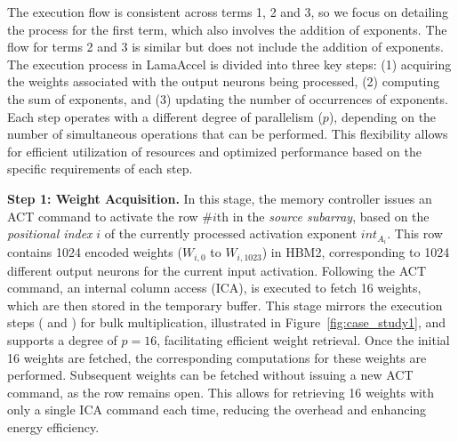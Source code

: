 The execution flow is consistent across terms 1, 2 and 3, so we focus on detailing the process for the first term, which also involves the addition of exponents. The flow for terms 2 and 3 is similar but does not include the addition of exponents. The execution process in LamaAccel is divided into three key steps: (1) acquiring the weights associated with the output neurons being processed, (2) computing the sum of exponents, and (3) updating the number of occurrences of exponents. Each step operates with a different degree of parallelism ($p$), depending on the number of simultaneous operations that can be performed. This flexibility allows for efficient utilization of resources and optimized performance based on the specific requirements of each step.

\textbf{Step 1: Weight Acquisition.} In this stage, the memory controller issues an ACT command to activate the row $\#i$th in the \textit{source subarray}, based on the \textit{positional index} $i$ of the currently processed activation exponent $int_{A_{i}}$. This row contains 1024 encoded weights ($W_{i,0}$ to $W_{i,1023}$) in HBM2, corresponding to 1024 different output neurons for the current input activation. Following the ACT command, an internal column access (ICA), is executed to fetch 16 weights, which are then stored in the temporary buffer. This stage mirrors the execution steps ( and ) for bulk multiplication, illustrated in Figure~\ref{fig:case_study1}, and supports a degree of $p=16$, facilitating efficient weight retrieval. Once the initial 16 weights are fetched, the corresponding computations for these weights are performed. Subsequent weights can be fetched without issuing a new ACT command, as the row remains open. This allows for retrieving 16 weights with only a single ICA command each time, reducing the overhead and enhancing energy efficiency.

